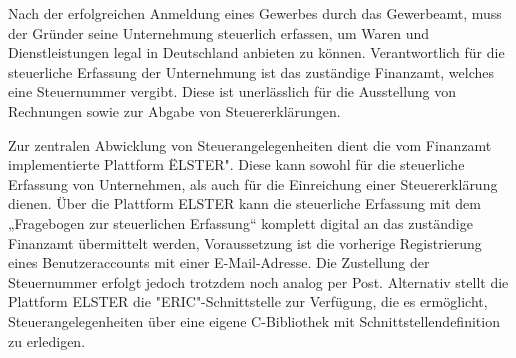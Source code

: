 Nach der erfolgreichen Anmeldung eines Gewerbes durch das Gewerbeamt, muss der Gründer seine Unternehmung steuerlich erfassen, um Waren und Dienstleistungen legal in Deutschland anbieten zu können.
 Verantwortlich für die steuerliche Erfassung der Unternehmung ist das zuständige Finanzamt, welches eine Steuernummer vergibt. Diese ist unerlässlich für die Ausstellung von Rechnungen sowie zur Abgabe von Steuererklärungen. 
 
 Zur zentralen Abwicklung von Steuerangelegenheiten dient die vom Finanzamt implementierte Plattform \"ELSTER".
 Diese kann sowohl für die steuerliche Erfassung von Unternehmen, als auch für die Einreichung einer Steuererklärung dienen. 
 Über die Plattform ELSTER kann die steuerliche Erfassung mit dem „Fragebogen zur steuerlichen Erfassung“ komplett digital an das zuständige Finanzamt übermittelt werden, Voraussetzung ist die vorherige Registrierung eines Benutzeraccounts mit einer E-Mail-Adresse. 
 Die Zustellung der Steuernummer erfolgt jedoch trotzdem noch analog per Post. 
 Alternativ stellt die Plattform ELSTER die "ERIC"-Schnittstelle zur Verfügung, die es ermöglicht, Steuerangelegenheiten über eine eigene C-Bibliothek mit Schnittstellendefinition zu erledigen. 
